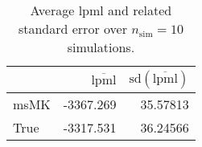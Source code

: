 \begin{table}[H]

\caption{Average lpml and related standard error over $n_{\text{sim}} = 10$ simulations.}
\centering
\begin{tabular}[t]{lrr}
\toprule
  & $\overbar{\text{lpml}}$ & $\text{sd}(\overbar{\text{lpml}})$\\
\midrule
msMK & -3367.269 & 35.57813\\
True & -3317.531 & 36.24566\\
\bottomrule
\end{tabular}
\end{table}